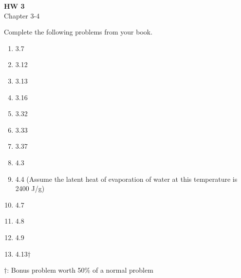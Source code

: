 \documentclass{article}
\begin{document}
\fancyfoot[C]{\thepage}
\vspace*{0cm}
\begin{center}
	{\LARGE \textbf{HW 3}}\\
	\vspace{.25cm}
	{\Large Chapter 3-4}
\end{center}

Complete the following problems from your book.

\begin{enumerate}
	\item 3.7
	\item 3.12
	\item 3.13
	\item 3.16
	\item 3.32
	\item 3.33
	\item 3.37
	\vspace{2cm}
	\item 4.3
	\item 4.4 (Assume the latent heat of evaporation of water at this temperature is 2400 J/g)
	\item 4.7
	\item 4.8
	\item 4.9
	\item 4.13$\dagger$
	
\end{enumerate}
$\dagger$: Bonus problem worth 50\% of a normal problem
\end{document}

